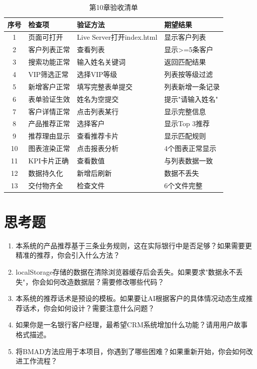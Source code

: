 \begin{table}[H]
\centering
\begin{tabular}{clll}
\toprule
\textbf{序号} & \textbf{检查项} & \textbf{验证方法} & \textbf{期望结果} \\
\midrule
1 & 页面可打开 & Live Server打开index.html & 显示客户列表 \\
2 & 客户列表正常 & 查看列表 & 显示>=5条客户 \\
3 & 搜索功能正常 & 输入姓名关键词 & 返回匹配结果 \\
4 & VIP筛选正常 & 选择VIP等级 & 列表按等级过滤 \\
5 & 新增客户正常 & 填写完整表单提交 & 列表新增一条记录 \\
6 & 表单验证生效 & 姓名为空提交 & 提示"请输入姓名" \\
7 & 客户详情正常 & 点击列表某行 & 显示完整信息 \\
8 & 产品推荐正常 & 选择客户 & 显示Top 3推荐 \\
9 & 推荐理由显示 & 查看推荐卡片 & 显示匹配规则 \\
10 & 图表渲染正常 & 点击报表分析 & 4个图表正常显示 \\
11 & KPI卡片正确 & 查看数值 & 与列表数据一致 \\
12 & 数据持久化 & 新增后刷新 & 数据不丢失 \\
13 & 交付物齐全 & 检查文件 & 6个文件完整 \\
\bottomrule
\end{tabular}
\caption{第10章验收清单}
\end{table}

\section{思考题}

\begin{exercisebox}[思考与讨论]
\begin{enumerate}[leftmargin=2em]
  \item 本系统的产品推荐基于三条业务规则，这在实际银行中是否足够？如果需要更精准的推荐，你会引入什么方法？
  \item localStorage存储的数据在清除浏览器缓存后会丢失。如果要求"数据永不丢失"，你会如何改造数据层？需要修改哪些代码？
  \item 本系统的推荐话术是预设的模板。如果要让AI根据客户的具体情况动态生成推荐话术，你会如何设计？需要注意什么问题？
  \item 如果你是一名银行客户经理，最希望CRM系统增加什么功能？请用用户故事格式描述。
  \item 将BMAD方法应用于本项目，你遇到了哪些困难？如果重新开始，你会如何改进工作流程？
\end{enumerate}
\end{exercisebox}
